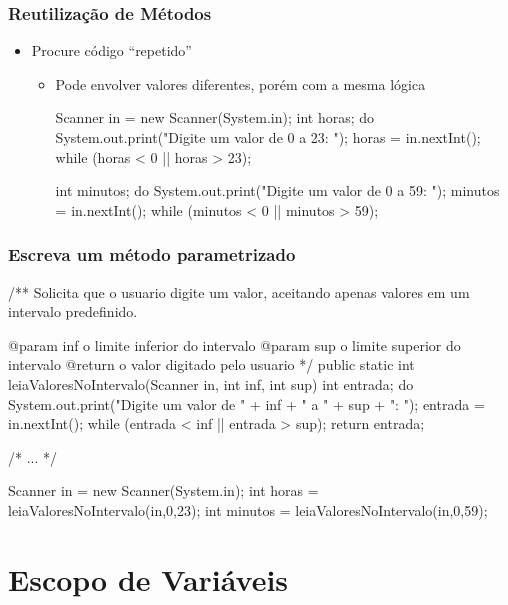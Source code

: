 \documentclass[xcolor={dvipsnames,table},aspectratio=169]{beamer}
\begin{document}
\begin{frame}[fragile]\frametitle{Reutilização de Métodos}
\begin{itemize}
	\item Procure código ``repetido''
	\begin{itemize}
		\item Pode envolver valores diferentes, porém com a mesma lógica
\begin{javacode}
Scanner in = new Scanner(System.in);
int horas;
do {
   System.out.print("Digite um valor de 0 a 23: ");
   horas = in.nextInt();
}  while (horas < 0 || horas > 23);

int minutos;
do {
   System.out.print("Digite um valor de 0 a 59: ");
   minutos = in.nextInt();
}  while (minutos < 0 || minutos > 59);
\end{javacode}
	\end{itemize}
\end{itemize}
\end{frame}

\begin{frame}[fragile]\frametitle{Escreva um método parametrizado}
{\tiny
\begin{javacode}
/**
  Solicita que o usuario digite um valor, aceitando apenas
  valores em um intervalo predefinido.

  @param inf o limite inferior do intervalo
  @param sup o limite superior do intervalo
  @return o valor digitado pelo usuario
*/
public static int leiaValoresNoIntervalo(Scanner in, int inf, int sup) {
  int entrada;
  do {
     System.out.print("Digite um valor de " + inf + " a " + sup + ": ");
     entrada = in.nextInt();
  }  while (entrada < inf || entrada > sup);
  return entrada;
}

/* ... */

Scanner in = new Scanner(System.in);
int horas = leiaValoresNoIntervalo(in,0,23);
int minutos = leiaValoresNoIntervalo(in,0,59);
\end{javacode}
}
\end{frame}

\section{Escopo de Variáveis}
\end{document}
